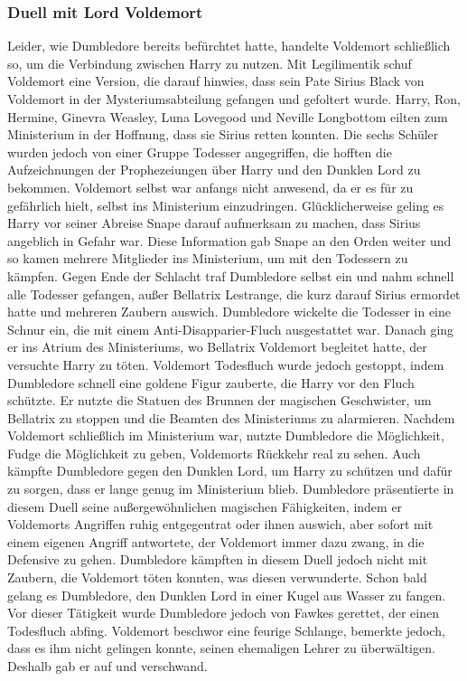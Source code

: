 \documentclass[a4paper, 10pt]{article}
\begin{document}
\subsubsection*{Duell mit Lord Voldemort}
Leider, wie Dumbledore bereits befürchtet hatte, handelte Voldemort schließlich so, um die Verbindung zwischen Harry zu nutzen. Mit Legilimentik schuf Voldemort eine Version, die darauf hinwies, dass sein Pate Sirius Black von Voldemort in der Mysteriumsabteilung gefangen und gefoltert wurde. Harry, Ron, Hermine, Ginevra Weasley, Luna Lovegood und Neville Longbottom eilten zum Ministerium in der Hoffnung, dass sie Sirius retten konnten. Die sechs Schüler wurden jedoch von einer Gruppe Todesser angegriffen, die hofften die Aufzeichnungen der Prophezeiungen über Harry und den Dunklen Lord zu bekommen. Voldemort selbst war anfangs nicht anwesend, da er es für zu gefährlich hielt, selbst ins Ministerium einzudringen. Glücklicherweise geling es Harry vor seiner Abreise Snape darauf aufmerksam zu machen, dass Sirius angeblich in Gefahr war. Diese Information gab Snape an den Orden weiter und so kamen mehrere Mitglieder ins Ministerium, um mit den Todessern zu kämpfen.
\vspace{10pt}
\newline
Gegen Ende der Schlacht traf Dumbledore selbst ein und nahm schnell alle Todesser gefangen, außer Bellatrix Lestrange, die kurz darauf Sirius ermordet hatte und mehreren Zaubern auswich. Dumbledore wickelte die Todesser in eine Schnur ein, die mit einem Anti-Disapparier-Fluch ausgestattet war. Danach ging er ins Atrium des Ministeriums, wo Bellatrix Voldemort begleitet hatte, der versuchte Harry zu töten.
\vspace{10pt}
\newline
Voldemort Todesfluch wurde jedoch gestoppt, indem Dumbledore schnell eine goldene Figur zauberte, die Harry vor den Fluch schützte. Er nutzte die Statuen des Brunnen der magischen Geschwister, um Bellatrix zu stoppen und die Beamten des Ministeriums zu alarmieren. Nachdem Voldemort schließlich im Ministerium war, nutzte Dumbledore die Möglichkeit, Fudge die Möglichkeit zu geben, Voldemorts Rückkehr real zu sehen. Auch kämpfte Dumbledore gegen den Dunklen Lord, um Harry zu schützen und dafür zu sorgen, dass er lange genug im Ministerium blieb. Dumbledore präsentierte in diesem Duell seine außergewöhnlichen magischen Fähigkeiten, indem er Voldemorts Angriffen ruhig entgegentrat oder ihnen auswich, aber sofort mit einem eigenen Angriff antwortete, der Voldemort immer dazu zwang, in die Defensive zu gehen. Dumbledore kämpften in diesem Duell jedoch nicht mit Zaubern, die Voldemort töten konnten, was diesen verwunderte. Schon bald gelang es Dumbledore, den Dunklen Lord in einer Kugel aus Wasser zu fangen. Vor dieser Tätigkeit wurde Dumbledore jedoch von Fawkes gerettet, der einen Todesfluch abfing. Voldemort beschwor eine feurige Schlange, bemerkte jedoch, dass es ihm nicht gelingen konnte, seinen ehemaligen Lehrer zu überwältigen. Deshalb gab er auf und verschwand.
\end{document}
